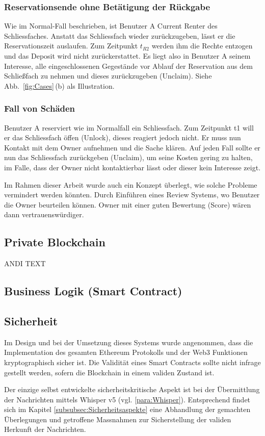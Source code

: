 
\subsubsection{Reservationsende ohne Betätigung der Rückgabe}
Wie im Normal-Fall beschrieben, ist Benutzer A Current Renter des Schliessfaches. Anstatt das Schliessfach wieder zurückzugeben, lässt er die Reservationszeit auslaufen. Zum Zeitpunkt $t_{R2}$ werden ihm die Rechte entzogen und das Deposit wird nicht zurückerstattet. Es liegt also in Benutzer A seinem Interesse, alle eingeschlossenen Gegestände vor Ablauf der Reservation aus dem Schließfach zu nehmen und dieses zurückzugeben (Unclaim). Siehe Abb.~\ref{fig:Cases}\,(b) als Illustration.

\subsubsection{Fall von Schäden}
Benutzer A reserviert wie im Normalfall ein Schliessfach. Zum Zeitpunkt t1 will er das Schliessfach öffen (Unlock), dieses reagiert jedoch nicht. Er muss nun Kontakt mit dem Owner aufnehmen und die Sache klären. Auf jeden Fall sollte er nun das Schliessfach zurückgeben (Unclaim), um seine Kosten gering zu halten, im Falle, dass der Owner nicht kontaktierbar lässt oder dieser kein Interesse zeigt.

Im Rahmen dieser Arbeit wurde auch ein Konzept überlegt, wie solche Probleme vermindert werden könnten. Durch Einführen eines Review Systems, wo Benutzer die Owner beurteilen können. Owner mit einer guten Bewertung (Score) wären dann vertrauenswürdiger.

\subsection{Private Blockchain}
ANDI TEXT

\subsection{Business Logik (Smart Contract)}


\subsection{Sicherheit}
Im Design und bei der Umsetzung dieses Systems wurde angenommen, dass die Implementation des gesamten Ethereum Protokolls und der Web3 Funktionen kryptographisch sicher ist. Die Validität eines Smart Contracts sollte nicht infrage gestellt werden, sofern die Blockchain in einem validen Zustand ist.\cite{github.com/ethereum/web3js, go-ethereum}

Der einzige selbst entwickelte sicherheitskritische Aspekt ist bei der Übermittlung der Nachrichten mittels Whisper v5 (vgl. \ref{para:Whisper}). Entsprechend findet sich im Kapitel \ref{subsubsec:Sicherheitsaspekte} eine Abhandlung der gemachten Überlegungen und getroffene Massnahmen zur Sicherstellung der validen Herkunft der Nachrichten.